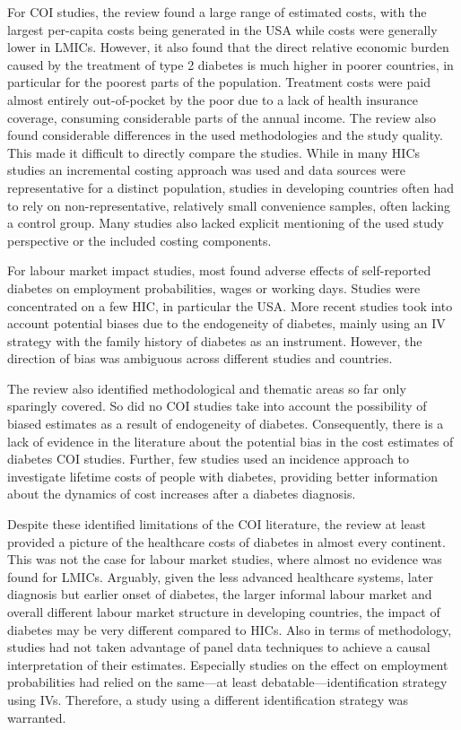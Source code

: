 For \ac{COI} studies, the review found a large range of estimated costs, with the largest per-capita costs being generated in the USA while costs were generally lower in \acp{LMIC}. However, it also found that the direct relative economic burden caused by the treatment of type 2 diabetes is much higher in poorer countries, in particular for the poorest parts of the population. Treatment costs were paid almost entirely out-of-pocket by the poor due to a lack of health insurance coverage, consuming considerable parts of the annual income.  The review also found considerable differences in the used methodologies and the study quality. This made it difficult to directly compare the studies. While in many \acp{HIC} studies an incremental costing approach was used and data sources were representative for a distinct population, studies in developing countries often had to rely on non-representative, relatively small convenience samples, often lacking a control group. Many studies also lacked explicit mentioning of the used study perspective or the included costing components. 

For labour market impact studies, most found adverse effects of self-reported diabetes on employment probabilities, wages or working days. Studies were concentrated on a few \ac{HIC}, in particular the USA. More recent studies took into account potential biases due to the endogeneity of diabetes, mainly using an \ac{IV} strategy with the family history of diabetes as an instrument. However, the direction of bias was ambiguous across different studies and countries. 

The review also identified methodological and thematic areas so far only sparingly covered. So did no \ac{COI} studies take into account the possibility of biased estimates as a result of endogeneity of diabetes. Consequently, there is a lack of evidence in the literature about the potential bias in the cost estimates of diabetes \ac{COI} studies. Further, few studies used an incidence approach to investigate lifetime costs of people with diabetes, providing better information about the dynamics of cost increases after a diabetes diagnosis. 

Despite these identified limitations of the \ac{COI} literature, the review at least provided a picture of the healthcare costs of diabetes in almost every continent. This was not the case for labour market studies, where almost no evidence was found for \acp{LMIC}. Arguably, given the less advanced healthcare systems, later diagnosis but earlier onset of diabetes, the larger informal labour market and overall different labour market structure in developing countries, the impact of diabetes may be very different compared to \acp{HIC}. Also in terms of methodology, studies had not taken advantage of panel data techniques to achieve a causal interpretation of their estimates. Especially studies on the effect on employment probabilities had relied on the same---at least debatable---identification strategy using \acp{IV}. Therefore, a study using a different identification strategy was warranted.

